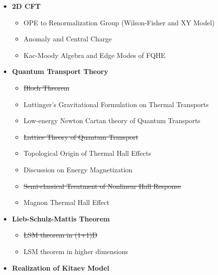 \documentclass[10pt,nofootinbib]{revtex4}
\begin{document}
\begin{itemize}[label=$\circ$]
	\item {\bf 2D CFT}
		\begin{itemize}[label=$\star$]
			\item OPE to Renormalization Group (Wilson-Fisher and XY Model) \cite{FradkinRG,sachdev2011quantum}
			\item Anomaly and Central Charge \cite{affleck1986universal,kapustin2019absence,FradkinCFT}
			\item Kac-Moody Algebra and Edge Modes of FQHE \cite{hansson2017quantum}
		\end{itemize}
	\item {\bf Quantum Transport Theory}
		\begin{itemize}[label=$\star$]
			\item \sout{Bloch Theorem \mbox{\cite{watanabe2019proof,bohm1949note,kapustin2019absence}}}
			\item Luttinger's Gravitational Formulation on Thermal Transports \cite{luttinger1964theory,cooper1997thermoelectric}
			\item Low-energy Newton Cartan theory of Quantum Transports \cite{gromov2015thermal,stone2012gravitational,dubovsky2012effective,bradlyn2015low}
			\item \sout{{\color{red}Lattice Theory of Quantum Transport \cite{kapustin2019thermal}}}
			\item {\color{red}Topological Origin of Thermal Hall Effects \cite{kane1997quantized,bradlyn2015low,kapustin2019thermal}}
			\item {\color{red}Discussion on Energy Magnetization \cite{xiao2006berry,qin2011energy,cooper1997thermoelectric}}
			\item \sout{Semi-classical Treatment of Nonlinear Hall Response \mbox{\cite{sodemann2015quantum}}}
			\item {Magnon Thermal Hall Effect \cite{murakami2016thermal,matsumoto2014thermal}}
		\end{itemize}
	\item {\bf Lieb-Schulz-Mattis Theorem}
		\begin{itemize}[label=$\star$]
			\item \sout{LSM theorem in (1+1)D \mbox{\cite{lieb1961two}}}
			\item LSM theorem in higher dimensions \cite{oshikawa2000commensurability,hastings2004lieb,nachtergaele2007multi}
		\end{itemize}
	\item {\bf Realization of Kitaev Model}

\end{itemize}
\end{document}
